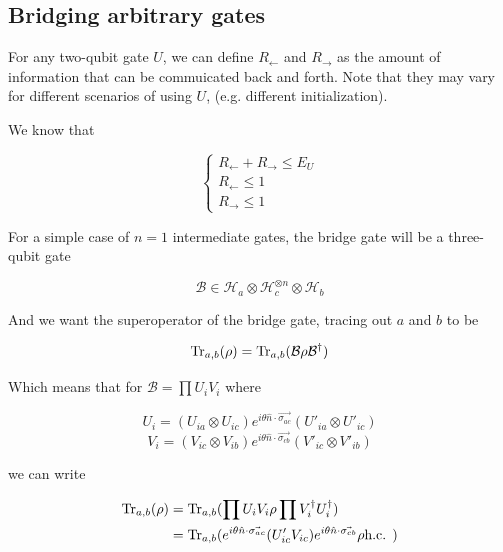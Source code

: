 \documentclass{report}
\begin{document}
\subsection*{Bridging arbitrary gates}

For any two-qubit gate $U$, we can define $R_\leftarrow$ and $R_\rightarrow$ as the amount of information that can be commuicated back and forth. Note that they may vary for different scenarios of using $U$, (e.g. different initialization).

We know that

\begin{equation}
  \begin{cases} 
    R_{\leftarrow} + R_{\rightarrow} \le E_U \\
    R_{\leftarrow} \le 1 \\
    R_{\rightarrow} \le 1
  \end{cases}
\end{equation}

For a simple case of $n=1$ intermediate gates, the bridge gate will be a three-qubit gate

\begin{equation}
  \mathcal{B} \in \mathcal{H}_a \otimes \mathcal{H}_c^{\otimes n} \otimes \mathcal{H}_b
\end{equation}

And we want the superoperator of the bridge gate, tracing out $a$ and $b$ to be

\begin{equation}
  \Tr_{a, b}(\rho) = \Tr_{a, b}(\mathcal{B} \rho \mathcal{B}^\dagger)
\end{equation}


Which means that for $\mathcal{B} = \prod U_i V_i$ where

\begin{equation}
  U_i = (U_{ia}\otimes U_{ic}) e^{i\theta \hat n \cdot \vec{\sigma_{ac}}} (U'_{ia} \otimes U'_{ic})
\end{equation}
\begin{equation}
  V_i = (V_{ic}\otimes V_{ib}) e^{i\theta \hat n \cdot \vec{\sigma_{cb}}} (V'_{ic} \otimes V'_{ib})
\end{equation}

we can write 

\begin{align}
  \Tr_{a, b}(\rho) &= \Tr_{a, b}(\prod U_i V_i \rho \prod V_i^\dagger U_i^\dagger) \\
  &= \Tr_{a, b}( e^{i\theta \hat n \cdot \vec{\sigma_{ac}}} (U'_{ic} V_{ic}) e^{i\theta \hat n \cdot \vec{\sigma_{cb}}} \rho \text{h.c. } )
\end{align}
\end{document}
